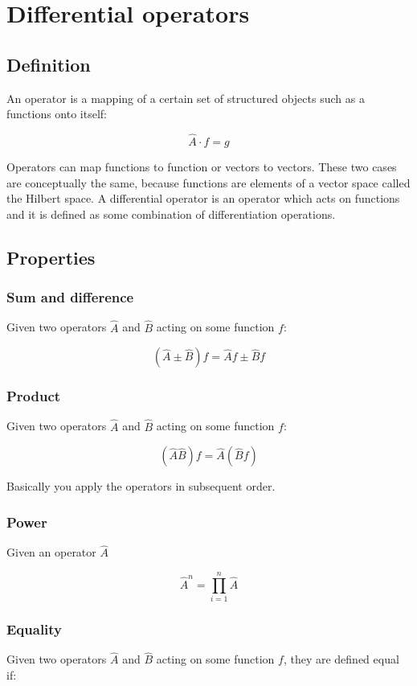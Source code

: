 \chapter{Differential operators}

\section{Definition}
An operator is a mapping of a certain set of structured objects such as a functions onto itself:

$$\hat{A}\cdot f = g$$

Operators can map functions to function or vectors to vectors.
These two cases are conceptually the same, because functions are elements of a vector space called the Hilbert space.
A differential operator is an operator which acts on functions and it is defined as some combination of differentiation operations.

\section{Properties}

	\subsection{Sum and difference}
	Given two operators $\hat{A}$ and $\hat{B}$ acting on some function $f$:

	$$(\hat{A} \pm\hat{B})f = \hat{A}f\pm \hat{B}f$$

	\subsection{Product}
	Given two operators $\hat{A}$ and $\hat{B}$ acting on some function $f$:

	$$(\hat{A}\hat{B})f = \hat{A}(\hat{B}f)$$

	Basically you apply the operators in subsequent order.

	\subsection{Power}
	Given an operator $\hat{A}$

	$$\hat{A}^n = \prod\limits_{i=1}^n\hat{A}$$

	\subsection{Equality}
	Given two operators $\hat{A}$ and $\hat{B}$ acting on some function $f$, they are defined equal if:

